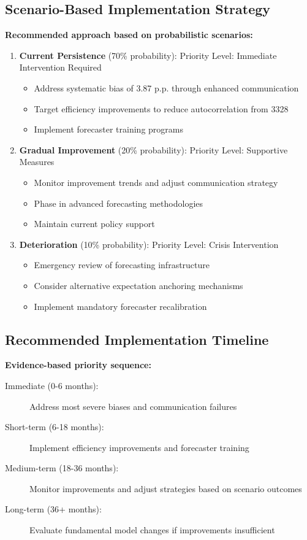 \documentclass[11pt,a4paper]{article}
\begin{document}
\subsection{Scenario-Based Implementation Strategy}
\textbf{Recommended approach based on probabilistic scenarios:}

\begin{enumerate}
\item \textbf{Current Persistence} (70\% probability):
Priority Level: Immediate Intervention Required
\begin{itemize}
    \item Address systematic bias of 3.87 p.p. through enhanced communication
    \item Target efficiency improvements to reduce autocorrelation from 3328
    \item Implement forecaster training programs
\end{itemize}
\item \textbf{Gradual Improvement} (20\% probability):
Priority Level: Supportive Measures
\begin{itemize}
    \item Monitor improvement trends and adjust communication strategy
    \item Phase in advanced forecasting methodologies
    \item Maintain current policy support
\end{itemize}
\item \textbf{Deterioration} (10\% probability):
Priority Level: Crisis Intervention
\begin{itemize}
\item Emergency review of forecasting infrastructure
\item Consider alternative expectation anchoring mechanisms
\item Implement mandatory forecaster recalibration
\end{itemize}
\end{enumerate}

\subsection{Recommended Implementation Timeline}
\textbf{Evidence-based priority sequence:}

\begin{description}
    \item[Immediate (0-6 months):] Address most severe biases and communication failures
    \item[Short-term (6-18 months):] Implement efficiency improvements and forecaster training
    \item[Medium-term (18-36 months):] Monitor improvements and adjust strategies based on scenario outcomes
    \item[Long-term (36+ months):] Evaluate fundamental model changes if improvements insufficient
\end{description}
\end{document}
